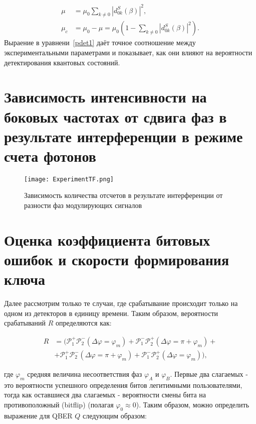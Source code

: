 \begin{align}
    \mu&=\mu_0\sum_{k\neq 0}|d_{0k}^{S}(\beta)|^2, \\
    \mu_c&=\mu_0-\mu=\mu_0(1-\sum_{k\neq 0}|d_{0k}^{S}(\beta)|^2).
\end{align}
Выраение в уравнени~\ref{pdet1} даёт точное соотношение между экспериментальными параметрами и показывает, как они влияют на вероятности детектирования квантовых состояний. 


\pagebreak

\section{Зависимость интенсивности на боковых частотах от сдвига фаз в результате интерференции в режиме счета фотонов} \label{ch:ch5/sec6}


 \begin{figure}[ht]
  \centering
  \texttt{[image: ExperimentTF.png]}
  \caption{Зависимость количества отсчетов в результате интерференции от разности фаз модулирующих сигналов}
  \label{fig:Experimental_TF}
\end{figure}


\pagebreak

\section{Оценка коэффициента битовых ошибок и скорости формирования ключа} \label{ch:ch5/sect7}

Далее рассмотрим только те случаи, где срабатывание происходит только на одном из детекторов в единицу времени.  Таким образом, вероятности срабатываний $R$ определяются как:

\begin{align}
    R&=\Big(\mathcal{P}_{1}^{+}\mathcal{P}_{2}^{-}(\Delta\varphi=\varphi_m)+\mathcal{P}_{1}^{-}\mathcal{P}_{2}^{+}(\Delta\varphi=\pi+\varphi_m)+ \nonumber \\
    &+\mathcal{P}_{1}^{+}\mathcal{P}_{2}^{-}(\Delta\varphi=\pi+\varphi_m)+\mathcal{P}_{1}^{-}\mathcal{P}_{2}^{+}(\Delta\varphi=\varphi_m)\Big),
\end{align}


где $\varphi_m$ средняя величина несоответствия фаз $\varphi_A$ и $\varphi_B$. Первые два слагаемых - это вероятности успешного определения битов легитимными пользователями, тогда как оставшиеся два слагаемых - вероятности смены бита на противоположный (bitflip) (полагая $\varphi_0 \approx 0$). Таким образом, можно определить выражение для QBER $Q$ следующим образом:

